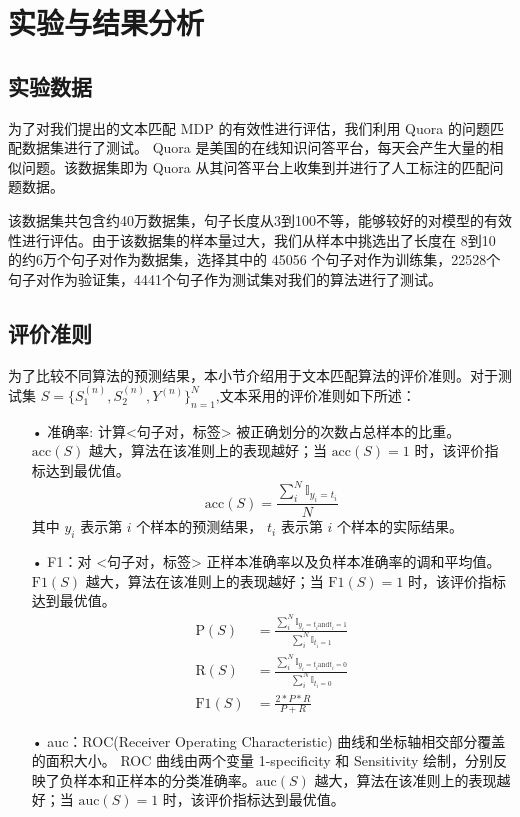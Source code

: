 \section{实验与结果分析}
\subsection{实验数据}
为了对我们提出的文本匹配 MDP 的有效性进行评估，我们利用 Quora 的问题匹配数据集进行了测试。 Quora 是美国的在线知识问答平台，每天会产生大量的相似问题。该数据集即为 Quora 从其问答平台上收集到并进行了人工标注的匹配问题数据。

该数据集共包含约40万数据集，句子长度从3到100不等，能够较好的对模型的有效性进行评估。由于该数据集的样本量过大，我们从样本中挑选出了长度在 8到10 的约6万个句子对作为数据集，选择其中的 45056 个句子对作为训练集，22528个句子对作为验证集，4441个句子作为测试集对我们的算法进行了测试。

\subsection{评价准则}
为了比较不同算法的预测结果，本小节介绍用于文本匹配算法的评价准则。对于测试集 $S = \{S_1^{(n)}, S_2^{(n)}, Y^{(n)}\}_{n=1}^N$,文本采用的评价准则如下所述：

\begin{itemize}
  \item[•] 准确率: 计算<句子对，标签> 被正确划分的次数占总样本的比重。 $\text{acc}(S)$ 越大，算法在该准则上的表现越好；当 $\text{acc}(S) = 1$ 时，该评价指标达到最优值。
  $$
  \text{acc}(S) = \frac{\sum_i^N\mathbb{I}_{y_i=t_i}}{N}
  $$
  其中 $y_i$ 表示第 $i$ 个样本的预测结果， $t_i$ 表示第 $i$ 个样本的实际结果。
  \item[•] F1：对 <句子对，标签> 正样本准确率以及负样本准确率的调和平均值。 $\text{F1}(S)$ 越大，算法在该准则上的表现越好；当 $\text{F1}(S) = 1$ 时，该评价指标达到最优值。
  $$
  \begin{aligned}
  \text{P}(S) &= \frac{\sum_i^N\mathbb{I}_{y_i=t_i \text{and} t_i = 1}}{\sum_i^N\mathbb{I}_{t_i = 1}}\\
  \text{R}(S) &= \frac{\sum_i^N\mathbb{I}_{y_i=t_i \text{and} t_i = 0}}{\sum_i^N\mathbb{I}_{t_i = 0}}\\
  \text{F1}(S) &= \frac{2*P*R}{P+R}
  \end{aligned}
  $$
  \item[•] auc：ROC(Receiver Operating Characteristic) 曲线和坐标轴相交部分覆盖的面积大小。 ROC 曲线由两个变量 1-specificity 和 Sensitivity 绘制，分别反映了负样本和正样本的分类准确率。$\text{auc}(S)$ 越大，算法在该准则上的表现越好；当 $\text{auc}(S) = 1$ 时，该评价指标达到最优值。
\end{itemize}

